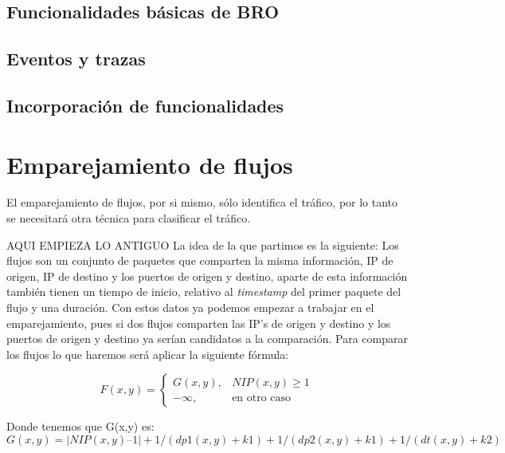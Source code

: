 \subsection{Funcionalidades básicas de BRO}

\subsection{Eventos y trazas}

\subsection{Incorporación de funcionalidades}

\section{Emparejamiento de flujos}

El emparejamiento de flujos, por si mismo, sólo identifica el tráfico, por lo tanto se necesitará otra técnica 
para clasificar el tráfico.



AQUI EMPIEZA LO ANTIGUO
\intro
La idea de la que partimos es la siguiente: 
Los flujos son un conjunto de paquetes que comparten la misma 
información, IP de origen, IP de destino y los puertos de origen 
y destino, aparte de esta información también tienen un tiempo de 
inicio, relativo al \textit{timestamp} del primer paquete del flujo y una 
duración. Con estos datos ya podemos empezar a trabajar en el 
emparejamiento, pues si dos flujos comparten las IP’s de origen y 
destino y los puertos de origen y destino ya serían candidatos a 
la comparación. 
\intro
Para comparar los flujos lo que haremos será aplicar la siguiente 
fórmula:
\intro

\begin{equation*}
	F(x,y)=
 	\begin{cases}
	  G(x,y), & NIP(x,y) \geq 1 \\
	  -\infty, & \text{en otro caso}
	 \end{cases}
\end{equation*}

\noindent Donde tenemos que G(x,y) es:
\intro
\begin{displaymath}
G(x,y) = |NIP(x,y) – 1| + 1 / (dp1(x,y) + k1) + 1 / (dp2(x,y) + k1) + 1 / (dt(x,y) + k2)
\end{displaymath}

